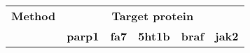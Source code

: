 \documentclass[lettersize,journal]{IEEEtran}
\begin{document}
\begin{table*}[t]
    \label{tab:target_protein_scores}
    \centering
    \small %

    \begin{tabular}{l ccccc}
        \hline
        \textbf{Method} & \multicolumn{5}{c}{\textbf{Target protein}} \\ 
        \cline{2-6} %

        & \textbf{parp1} & \textbf{fa7} & \textbf{5ht1b} & \textbf{braf} & \textbf{jak2} \\
        \hline
        

\end{tabular}
\end{table*}
\end{document}

